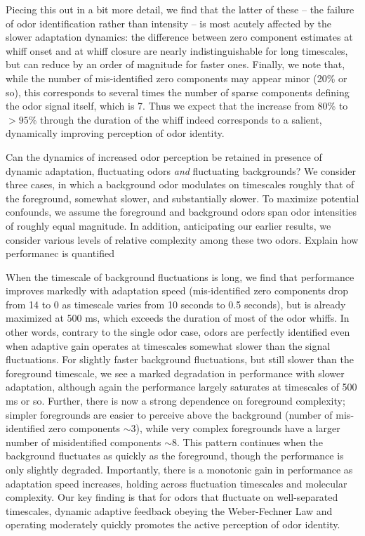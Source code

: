 Piecing this out in a bit more detail, we find that the latter of these -- the failure of odor identification rather than intensity -- is most acutely affected by the slower adaptation dynamics: the difference between zero component estimates at whiff onset and at whiff closure are nearly indistinguishable for long timescales, but can reduce by an order of magnitude for faster ones. Finally, we note that, while the number of mis-identified zero components may appear minor (20\% or so), this corresponds to several times the number of sparse components defining the odor signal itself, which is 7. Thus we expect that the increase from 80\% to $> 95$\% through the duration of the whiff indeed corresponds to a salient, dynamically improving perception of odor identity. 

Can the dynamics of increased odor perception be retained in presence of dynamic adaptation, fluctuating odors \textit{and} fluctuating backgrounds? We consider three cases, in which a background odor modulates on timescales roughly that of the foreground, somewhat slower, and substantially slower. To maximize potential confounds, we assume the foreground and background odors span odor intensities of roughly equal magnitude. In addition, anticipating our earlier results, we consider various levels of relative complexity among these two odors. {\color{blue} Explain how performanec is quantified}

When the timescale of background fluctuations is long, we find that performance improves markedly with adaptation speed (mis-identified zero components drop from 14 to 0 as timescale varies from 10 seconds to 0.5 seconds), but is already maximized at 500 ms, which exceeds the duration of most of the odor whiffs. In other words, contrary to the single odor case, odors are perfectly identified even when adaptive gain operates at timescales somewhat slower than the signal fluctuations. For slightly faster background fluctuations, but still slower than the foreground timescale, we see a marked degradation in performance with slower adaptation, although again the performance largely saturates at timescales of 500 ms or so. Further, there is now a strong dependence on foreground complexity; simpler foregrounds are easier to perceive above the background (number of mis-identified zero components $\sim 3$), while very complex foregrounds have a larger number of misidentified components $\sim 8$. This pattern continues when the background fluctuates as quickly as the foreground, though the performance  is only slightly degraded. Importantly, there is a monotonic gain in performance as adaptation speed increases, holding across fluctuation timescales and molecular complexity. Our key finding is that for odors that fluctuate on well-separated timescales, dynamic adaptive feedback obeying the Weber-Fechner Law and operating moderately quickly promotes the active perception of odor identity. 


